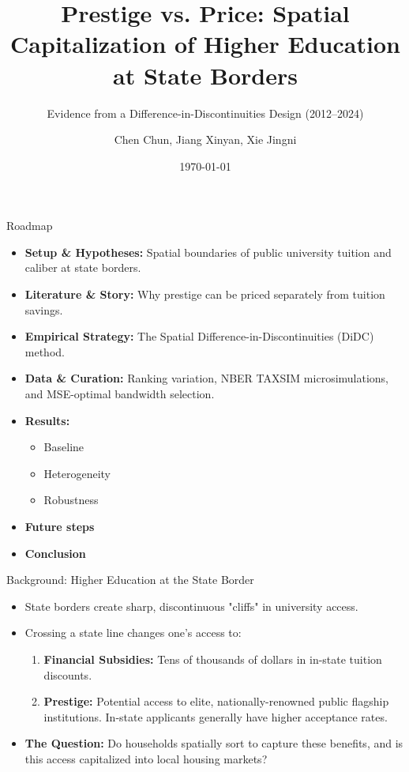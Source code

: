 \documentclass[10pt, aspectratio=169]{beamer}
\title[Prestige vs. Price]{Prestige vs. Price: Spatial Capitalization of Higher Education at State Borders}
\subtitle{Evidence from a Difference-in-Discontinuities Design (2012--2024)}
\author[Author Name]{Chen Chun, Jiang Xinyan, Xie Jingni}
\institute[Institution]{Faculty of Business and Economics, The University of Hong Kong}
\date{\today}
\begin{document}

\begin{frame}
    \titlepage
\end{frame}

\begin{frame}{Roadmap}
    \begin{itemize}
        \item \textbf{Setup \& Hypotheses:} Spatial boundaries of public university tuition and caliber at state borders.
        \item \textbf{Literature \& Story:} Why prestige can be priced separately from tuition savings.
        \item \textbf{Empirical Strategy:} The Spatial Difference-in-Discontinuities (DiDC) method.
        \item \textbf{Data \& Curation:} Ranking variation, NBER TAXSIM microsimulations, and MSE-optimal bandwidth selection.
        \item \textbf{Results:} 
        \begin{itemize}
            \item Baseline
            \item Heterogeneity
            \item Robustness
        \end{itemize}
        \item \textbf{Future steps}
        \item \textbf{Conclusion}
    \end{itemize}
\end{frame}

\begin{frame}{Background: Higher Education at the State Border}
    \begin{itemize}
        \item State borders create sharp, discontinuous "cliffs" in university access.
        \item Crossing a state line changes one's access to:
        \begin{enumerate}
            \item \textbf{Financial Subsidies:} Tens of thousands of dollars in in-state tuition discounts.
            \item \textbf{Prestige:} Potential access to elite, nationally-renowned public flagship institutions. In-state applicants generally have higher acceptance rates.
        \end{enumerate}
        \item \textbf{The Question:} Do households spatially sort to capture these benefits, and is this access capitalized into local housing markets?
    \end{itemize}
\end{frame}
\end{document}
